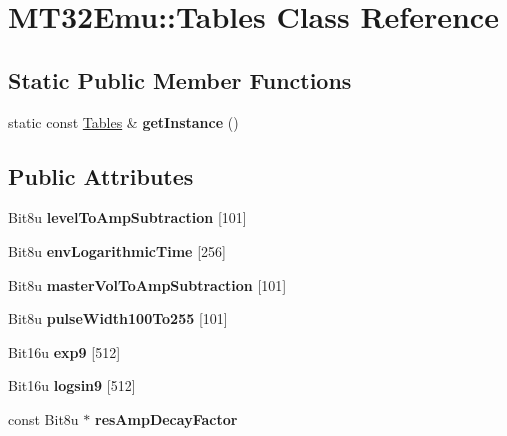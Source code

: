 \hypertarget{classMT32Emu_1_1Tables}{\section{M\-T32\-Emu\-:\-:Tables Class Reference}
\label{classMT32Emu_1_1Tables}
}
\subsection*{Static Public Member Functions}
\begin{DoxyCompactItemize}
\item 
\hypertarget{classMT32Emu_1_1Tables_a92557d129127ce714b333dce71c74cb9}{static const \hyperlink{classMT32Emu_1_1Tables}{Tables} \& {\bfseries get\-Instance} ()}\label{classMT32Emu_1_1Tables_a92557d129127ce714b333dce71c74cb9}

\end{DoxyCompactItemize}
\subsection*{Public Attributes}
\begin{DoxyCompactItemize}
\item 
\hypertarget{classMT32Emu_1_1Tables_a4a7167e3c556703bead810994b032688}{Bit8u {\bfseries level\-To\-Amp\-Subtraction} \mbox{[}101\mbox{]}}\label{classMT32Emu_1_1Tables_a4a7167e3c556703bead810994b032688}

\item 
\hypertarget{classMT32Emu_1_1Tables_a48bd2926c8d20384abedb4592204bd2c}{Bit8u {\bfseries env\-Logarithmic\-Time} \mbox{[}256\mbox{]}}\label{classMT32Emu_1_1Tables_a48bd2926c8d20384abedb4592204bd2c}

\item 
\hypertarget{classMT32Emu_1_1Tables_a3052d321c8366975b674bf4b45f36787}{Bit8u {\bfseries master\-Vol\-To\-Amp\-Subtraction} \mbox{[}101\mbox{]}}\label{classMT32Emu_1_1Tables_a3052d321c8366975b674bf4b45f36787}

\item 
\hypertarget{classMT32Emu_1_1Tables_acd94250bdab13fb6e62ec3dbb092902a}{Bit8u {\bfseries pulse\-Width100\-To255} \mbox{[}101\mbox{]}}\label{classMT32Emu_1_1Tables_acd94250bdab13fb6e62ec3dbb092902a}

\item 
\hypertarget{classMT32Emu_1_1Tables_ab9a55daaf9d1d665fb15b79277cfaa3b}{Bit16u {\bfseries exp9} \mbox{[}512\mbox{]}}\label{classMT32Emu_1_1Tables_ab9a55daaf9d1d665fb15b79277cfaa3b}

\item 
\hypertarget{classMT32Emu_1_1Tables_a0c005314e0c77a3b66bab69806d7746b}{Bit16u {\bfseries logsin9} \mbox{[}512\mbox{]}}\label{classMT32Emu_1_1Tables_a0c005314e0c77a3b66bab69806d7746b}

\item 
\hypertarget{classMT32Emu_1_1Tables_aa932cb17342df3a0e106368f8d8b715c}{const Bit8u $\ast$ {\bfseries res\-Amp\-Decay\-Factor}}\label{classMT32Emu_1_1Tables_aa932cb17342df3a0e106368f8d8b715c}

\end{DoxyCompactItemize}


